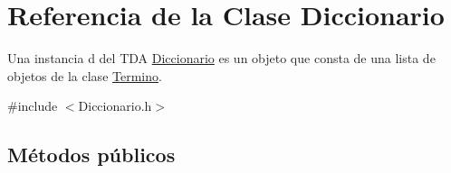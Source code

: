 \hypertarget{classDiccionario}{}\section{Referencia de la Clase Diccionario}
\label{classDiccionario}


Una instancia d del T\+DA \mbox{\hyperlink{classDiccionario}{Diccionario}} es un objeto que consta de una lista de objetos de la clase \mbox{\hyperlink{classTermino}{Termino}}.  




{\ttfamily \#include $<$Diccionario.\+h$>$}

\subsection*{Métodos públicos}
